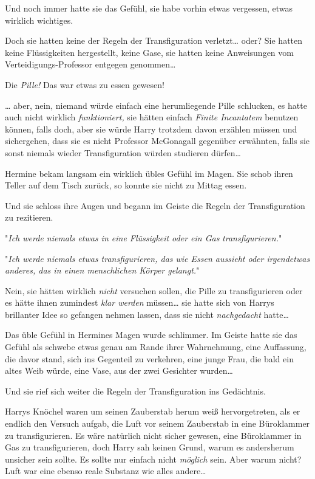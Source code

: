 {Und noch immer hatte sie das Gefühl, sie habe vorhin etwas vergessen, etwas wirklich wichtiges.

Doch sie hatten keine der Regeln der Transfiguration verletzt… oder? Sie hatten keine Flüssigkeiten hergestellt, keine Gase, sie hatten keine Anweisungen vom Verteidigungs-Professor entgegen genommen…

Die \emph{Pille!} Das war etwas zu essen gewesen!

… aber, nein, niemand würde einfach eine herumliegende Pille schlucken, es hatte auch nicht wirklich \emph{funktioniert,} sie hätten einfach \emph{Finite Incantatem} benutzen können, falls doch, aber sie würde Harry trotzdem davon erzählen müssen und sichergehen, dass sie es nicht Professor McGonagall gegenüber erwähnten, falls sie sonst niemals wieder Transfiguration würden studieren dürfen…

Hermine bekam langsam ein wirklich übles Gefühl im Magen. Sie schob ihren Teller auf dem Tisch zurück, so konnte sie nicht zu Mittag essen.

Und sie schloss ihre Augen und begann im Geiste die Regeln der Transfiguration zu rezitieren.

"\emph{Ich werde niemals etwas in eine Flüssigkeit oder ein Gas} \emph{transfigurieren.}"

"\emph{Ich werde niemals etwas transfigurieren, das wie Essen aussieht oder irgendetwas anderes, das in einen menschlichen Körper gelangt.}"

Nein, sie hätten wirklich \emph{nicht} versuchen sollen, die Pille zu transfigurieren oder es hätte ihnen zumindest \emph{klar werden} müssen… sie hatte sich von Harrys brillanter Idee so gefangen nehmen lassen, dass sie nicht \emph{nachgedacht} hatte…

Das üble Gefühl in Hermines Magen wurde schlimmer. Im Geiste hatte sie das Gefühl als schwebe etwas genau am Rande ihrer Wahrnehmung, eine Auffassung, die davor stand, sich ins Gegenteil zu verkehren, eine junge Frau, die bald ein altes Weib würde, eine Vase, aus der zwei Gesichter wurden…

Und sie rief sich weiter die Regeln der Transfiguration ins Gedächtnis.

\later

Harrys Knöchel waren um seinen Zauberstab herum weiß hervorgetreten, als er endlich den Versuch aufgab, die Luft vor seinem Zauberstab in eine Büroklammer zu transfigurieren. Es wäre natürlich nicht sicher gewesen, eine Büroklammer in Gas zu transfigurieren, doch Harry sah keinen Grund, warum es andersherum unsicher sein sollte. Es sollte nur einfach nicht \emph{möglich} sein. Aber warum nicht? Luft war eine ebenso reale Substanz wie alles andere…

}
